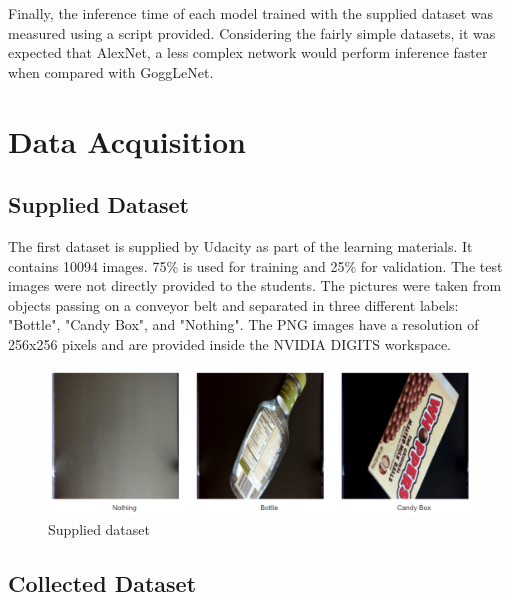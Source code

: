 \documentclass[10pt,journal,compsoc]{IEEEtran}
\begin{document}
Finally, the inference time of each model trained with the supplied dataset was measured using a script provided. Considering the fairly simple datasets, it was expected that AlexNet, a less complex network would perform inference faster when compared with GoggLeNet. 
\section{Data Acquisition}

\subsection{Supplied Dataset}
The first dataset is supplied by Udacity as part of the learning materials. It contains 10094 images. 75\% is used for training and 25\% for validation. The test images were not directly provided to the students. The pictures were taken from objects passing on a conveyor belt and separated in three different labels: "Bottle", "Candy Box", and "Nothing". The PNG images have a resolution of 256x256 pixels and are provided inside the NVIDIA DIGITS workspace.
\begin{figure}[thpb]
      \centering
      \includegraphics[width=\linewidth]{p_dataset.png}
      \caption{Supplied dataset}
      \label{fig:supplied_dataset}
\end{figure}

\subsection{Collected Dataset}
\end{document}

